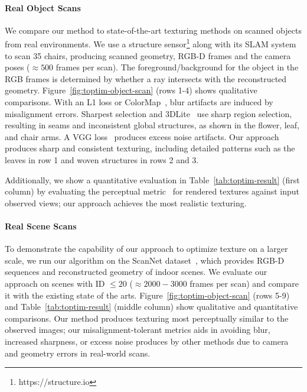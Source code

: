 \paragraph*{Real Object Scans}
We compare our method to state-of-the-art texturing methods on scanned objects from real environments. We use a structure sensor\footnote{https://structure.io} along with its SLAM system to scan 35 chairs, producing scanned geometry, RGB-D frames and the camera poses ($\approx 500$ frames per scan). 
The foreground/background for the object in the RGB frames is determined by whether a ray intersects with the reconstructed geometry. Figure~\ref{fig:toptim-object-scan} (rows 1-4) shows qualitative comparisons.
With an L1 loss or ColorMap~\cite{zhou2014color}, blur artifacts are induced by misalignment errors.
Sharpest selection and 3DLite~\cite{huang20173dlite} use sharp region selection, resulting in seams and inconsistent global structures, as shown in the flower, leaf, and chair arms. 
A VGG loss~\cite{johnson2016perceptual} produces excess noise artifacts.  
Our approach produces sharp and consistent texturing, including detailed patterns such as the leaves in row 1 and woven structures in rows 2 and 3.

Additionally, we show a quantitative evaluation in Table~\ref{tab:toptim-result} (first column) by evaluating the perceptual metric~\cite{zhang2018unreasonable} for rendered textures against input observed views; our approach achieves the most realistic texturing.

\paragraph*{Real Scene Scans}
To demonstrate the capability of our approach to optimize texture on a larger scale, we run our algorithm on the ScanNet dataset~\cite{dai2017scannet}, which provides RGB-D sequences and reconstructed geometry of indoor scenes.
We evaluate our approach on scenes with ID $\leq 20$ ($\approx 2000-3000$ frames per scan) and compare it with the existing state of the arts. 
Figure~\ref{fig:toptim-object-scan} (rows 5-9) and Table~\ref{tab:toptim-result} (middle column) show qualitative and quantitative comparisons. 
Our method produces texturing most perceptually similar to the observed images; our misalignment-tolerant metrics aids in avoiding blur, increased sharpness, or excess noise produces by other methods due to camera and geometry errors in real-world scans.

